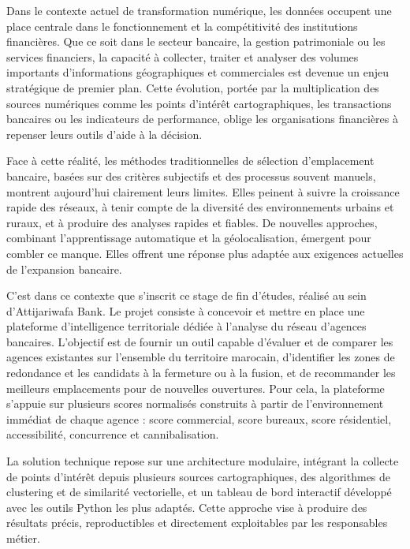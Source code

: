 \documentclass[11pt,a4paper,twoside]{report}
\begin{document}
Dans le contexte actuel de transformation numérique, les données occupent une place centrale dans le fonctionnement et la compétitivité des institutions financières. Que ce soit dans le secteur bancaire, la gestion patrimoniale ou les services financiers, la capacité à collecter, traiter et analyser des volumes importants d'informations géographiques et commerciales est devenue un enjeu stratégique de premier plan. Cette évolution, portée par la multiplication des sources numériques comme les points d'intérêt cartographiques, les transactions bancaires ou les indicateurs de performance, oblige les organisations financières à repenser leurs outils d'aide à la décision.

Face à cette réalité, les méthodes traditionnelles de sélection d'emplacement bancaire, basées sur des critères subjectifs et des processus souvent manuels, montrent aujourd'hui clairement leurs limites. Elles peinent à suivre la croissance rapide des réseaux, à tenir compte de la diversité des environnements urbains et ruraux, et à produire des analyses rapides et fiables. De nouvelles approches, combinant l'apprentissage automatique et la géolocalisation, émergent pour combler ce manque. Elles offrent une réponse plus adaptée aux exigences actuelles de l'expansion bancaire.

C'est dans ce contexte que s'inscrit ce stage de fin d'études, réalisé au sein d'Attijariwafa Bank. Le projet consiste à concevoir et mettre en place une plateforme d'intelligence territoriale dédiée à l'analyse du réseau d'agences bancaires. L'objectif est de fournir un outil capable d'évaluer et de comparer les agences existantes sur l'ensemble du territoire marocain, d'identifier les zones de redondance et les candidats à la fermeture ou à la fusion, et de recommander les meilleurs emplacements pour de nouvelles ouvertures. Pour cela, la plateforme s'appuie sur plusieurs scores normalisés construits à partir de l'environnement immédiat de chaque agence : score commercial, score bureaux, score résidentiel, accessibilité, concurrence et cannibalisation.

La solution technique repose sur une architecture modulaire, intégrant la collecte de points d'intérêt depuis plusieurs sources cartographiques, des algorithmes de clustering et de similarité vectorielle, et un tableau de bord interactif développé avec les outils Python les plus adaptés. Cette approche vise à produire des résultats précis, reproductibles et directement exploitables par les responsables métier.
\end{document}
